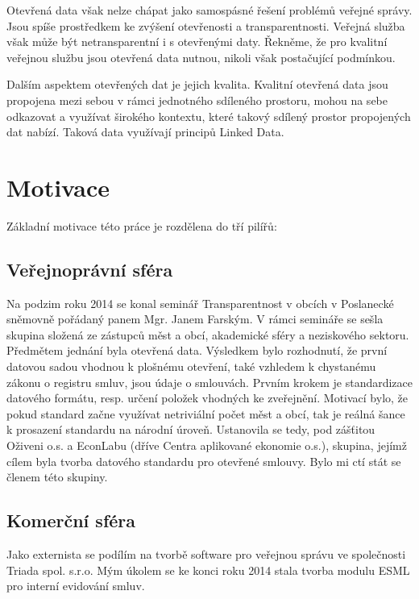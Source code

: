 Otevřená data však nelze chápat jako samospásné řešení problémů veřejné správy. Jsou spíše prostředkem ke zvýšení otevřenosti a transparentnosti. Veřejná služba však může být netransparentní i s otevřenými daty. Řekněme, že pro kvalitní veřejnou službu jsou otevřená data nutnou, nikoli však postačující podmínkou.

Dalším aspektem otevřených dat je jejich kvalita. Kvalitní otevřená data jsou propojena mezi sebou v rámci jednotného sdíleného prostoru, mohou na sebe odkazovat a využívat širokého kontextu, které takový sdílený prostor propojených dat nabízí. Taková data využívají principů Linked Data.\cite{opendatapsi, opendatagovernment, opendatacr, odgov_s}

\section{Motivace}

Základní motivace této práce je rozdělena do tří pilířů:

\subsection*{Veřejnoprávní sféra}

Na podzim roku 2014 se konal seminář Transparentnost v obcích\cite{spt} v Poslanecké sněmovně pořádaný panem Mgr. Janem Farským. V rámci semináře se sešla skupina složená ze zástupců měst a obcí, akademické sféry a neziskového sektoru. Předmětem jednání byla otevřená data. Výsledkem bylo rozhodnutí, že první datovou sadou vhodnou k plošnému otevření, také vzhledem k chystanému zákonu o registru smluv\cite{z42}, jsou údaje o smlouvách. Prvním krokem je standardizace datového formátu, resp. určení položek vhodných ke zveřejnění. Motivací bylo, že pokud standard začne využívat netriviální počet měst a obcí, tak je reálná šance k prosazení standardu na národní úroveň. Ustanovila se tedy, pod zášťitou Oživeni o.s. a EconLabu (dříve Centra aplikované ekonomie o.s.)\cite{econLab},  skupina, jejímž cílem byla tvorba datového standardu pro otevřené smlouvy. Bylo mi ctí stát se členem této skupiny.

\subsection*{Komerční sféra}

Jako externista se podílím na tvorbě software pro veřejnou správu ve společnosti Triada spol. s.r.o. Mým úkolem se ke konci roku 2014 stala tvorba modulu ESML pro interní evidování smluv.

